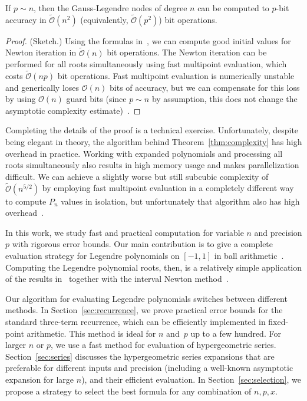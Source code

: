 \documentclass{siamart0216}
\newcommand{\OO}{\mathcal{O}}
\newcommand{\OOtilde}{\widetilde{\mathcal{O}}}
\begin{document}
\begin{theorem}
\label{thm:complexity}
If $p \sim n$, then the Gauss-Legendre nodes of degree $n$ can be computed to
$p$-bit accuracy in $\OOtilde(n^2)$ (equivalently, $\OOtilde(p^2)$) bit operations.
\end{theorem}

\begin{proof}
(Sketch.)
Using the formulas in~\cite{petras1999computation},
we can compute good initial values for Newton iteration
in $\OOtilde(n)$ bit operations.
The Newton iteration can be performed for all roots
simultaneously using fast multipoint evaluation, which costs
$\OOtilde(n p)$ bit operations.
Fast multipoint evaluation is numerically unstable and
generically loses $\OO(n)$ bits of accuracy, but we can compensate for
this loss by using $\OO(n)$ guard bits
(since $p \sim n$ by assumption, this does not change the asymptotic complexity estimate)~\cite{kobel2013fast}.
\end{proof}

Completing the details
of the proof is a technical exercise.
Unfortunately, despite being elegant in theory,
the algorithm behind Theorem~\ref{thm:complexity} has high overhead
in practice. Working with expanded polynomials and
processing all roots simultaneously also results in high memory usage and
makes parallelization difficult.
We can achieve a slightly worse but still subcubic
complexity of $\OOtilde(n^{5/2})$
by employing
fast multipoint evaluation in a completely different way
to compute $P_n$ values in isolation,
but unfortunately that algorithm
also has high overhead~\cite{Johansson2014rectangular}.

In this work, we study fast and practical computation for variable $n$
and precision $p$ with rigorous error bounds.
Our main contribution is to give a complete evaluation strategy
for Legendre polynomials on $[-1,1]$ in ball arithmetic~\cite{vdH:ball,Johansson2017arb}.
Computing the Legendre polynomial roots, then,
is a relatively simple application of the results
in~\cite{petras1999computation} together with
the interval Newton method~\cite{moore1979methods}.

Our algorithm for evaluating Legendre polynomials switches between
different methods.
In Section~\ref{sec:recurrence},
we prove practical error bounds for the standard three-term recurrence,
which can be efficiently implemented
in fixed-point arithmetic.
This method is ideal for $n$ and~$p$ up to a few hundred.
For larger $n$ or $p$, we use a fast method for evaluation
of hypergeometric series.
Section~\ref{sec:series} discusses the hypergeometric series
expansions that are preferable for different inputs and precision
(including a well-known asymptotic expansion for large $n$),
and their efficient evaluation.
In Section \ref{sec:selection}, we propose a strategy to select the
best formula for any combination of $n, p, x$.
\end{document}
